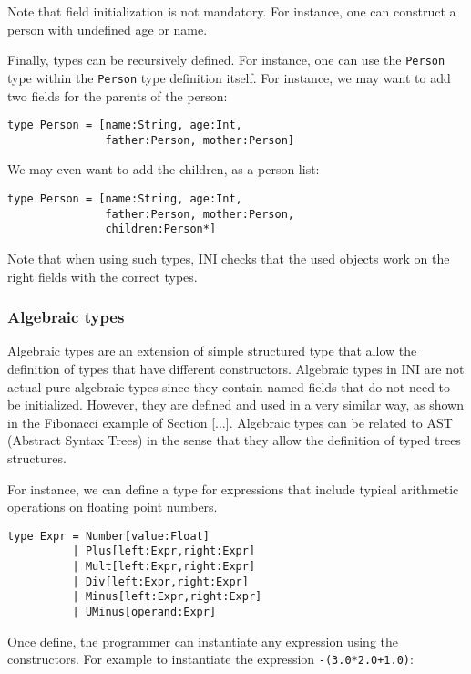 \documentclass[11pt]{article}
\begin{document}
Note that field initialization is not mandatory. For instance, one can construct a person with undefined age or name.

Finally, types can be recursively defined. For instance, one can use the \texttt{Person} type within the \texttt{Person} type definition itself. For instance, we may want to add two fields for the parents of the person:

\begin{lstlisting}[numbers=none]
type Person = [name:String, age:Int,
               father:Person, mother:Person]
\end{lstlisting}

We may even want to add the children, as a person list:

\begin{lstlisting}[numbers=none]
type Person = [name:String, age:Int,
               father:Person, mother:Person,
               children:Person*]
\end{lstlisting}

Note that when using such types, INI checks that the used objects work on the right fields with the correct types.

\subsubsection{Algebraic types}

Algebraic types are an extension of simple structured type that allow the definition of types that have different constructors. Algebraic types in INI are not actual pure algebraic types since they contain named fields that do not need to be initialized. However, they are defined and used in a very similar way, as shown in the Fibonacci example of Section [...]. Algebraic types can be related to AST (Abstract Syntax Trees) in the sense that they allow the definition of typed trees structures.

For instance, we can define a type for expressions that include typical arithmetic operations on floating point numbers.

\begin{lstlisting}[numbers=none]
type Expr = Number[value:Float]
          | Plus[left:Expr,right:Expr]
          | Mult[left:Expr,right:Expr]
          | Div[left:Expr,right:Expr]
          | Minus[left:Expr,right:Expr]
          | UMinus[operand:Expr]
\end{lstlisting}

Once define, the programmer can instantiate any expression using the constructors. For example to instantiate the expression \texttt{-(3.0*2.0+1.0)}:
\end{document}
